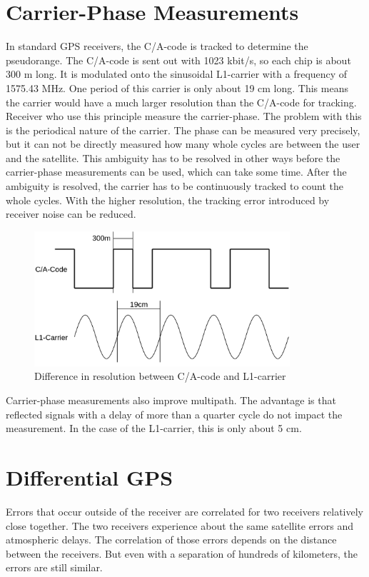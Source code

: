 \section{Carrier-Phase Measurements}

In standard GPS receivers, the C/A-code is tracked to determine the pseudorange.
The C/A-code is sent out with 1023 kbit/s, so each chip is about 300 m long.
It is modulated onto the sinusoidal L1-carrier with a frequency of 1575.43 MHz.
One period of this carrier is only about 19 cm long.
This means the carrier would have a much larger resolution than the C/A-code for tracking.
Receiver who use this principle measure the carrier-phase.
The problem with this is the periodical nature of the carrier.
The phase can be measured very precisely, but it can not be directly measured how many whole cycles are between the user and the satellite.
This ambiguity has to be resolved in other ways before the carrier-phase measurements can be used, which can take some time.
After the ambiguity is resolved, the carrier has to be continuously tracked to count the whole cycles.
With the higher resolution, the tracking error introduced by receiver noise can be reduced.

\begin{figure}[ht]
 \centering
 \includegraphics[height=5cm]{images/Carrier-Phase_Measurement.png}
 \caption{Difference in resolution between C/A-code and L1-carrier}
 \label{fig:carrier_phase}
\end{figure}

Carrier-phase measurements also improve multipath.
The advantage is that reflected signals with a delay of more than a quarter cycle do not impact the measurement.
In the case of the L1-carrier, this is only about 5 cm.
\cite{misra2011global}


\section{Differential GPS}

Errors that occur outside of the receiver are correlated for two receivers relatively close together.
The two receivers experience about the same satellite errors and atmospheric delays.
The correlation of those errors depends on the distance between the receivers.
But even with a separation of hundreds of kilometers, the errors are still similar.


